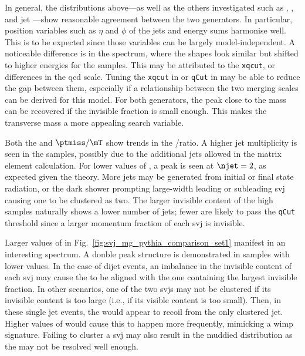 In general, the distributions above---as well as the others investigated such as \ptmiss, \mht, and \gls{jet} \pt---show reasonable agreement between the two generators. In particular, position variables such as $\eta$ and $\phi$ of the \glspl{jet} and energy sums harmonise well. This is to be expected since those variables can be largely model-independent. A noticeable difference is in the \mT spectrum, where the shapes look similar but shifted to higher energies for the \MADGRAPH samples. This may be attributed to the \texttt{xqcut}, or differences in the \acrshort{qcd} scale. Tuning the \texttt{xqcut} in \MADGRAPH or \texttt{qCut} in \PYTHIA may be able to reduce the gap between them, especially if a relationship between the two merging scales can be derived for this model. For both generators, the peak close to the \PZprime mass can be recovered if the invisible fraction is small enough. This makes the transverse mass a more appealing search variable.

Both the \njet and $\ptmiss/\mT$ show trends in the \MADGRAPH/\PYTHIA ratio. A higher \gls{jet} multiplicity is seen in the \MADGRAPH samples, possibly due to the additional \glspl{jet} allowed in the matrix element calculation. For lower values of \rinv, a peak is seen at $\njet = \text{2}$, as expected given the theory. More \glspl{jet} may be generated from initial or final state radiation, or the dark shower prompting large-width leading or subleading \gls{svj} causing one to be clustered as two. The larger invisible content of the high \rinv samples naturally shows a lower number of \glspl{jet}; fewer are likely to pass the \texttt{qCut} threshold since a larger momentum fraction of each \gls{svj} is invisible.

Larger values of \rinv in Fig.~\ref{fig:svj_mg_pythia_comparison_set1} manifest in an interesting \mindphi spectrum. A double peak structure is demonstrated in samples with lower values. In the case of dijet events, an imbalance in the invisible content of each \gls{svj} may cause the \ptmiss to be aligned with the one containing the largest invisible fraction. In other scenarios, one of the two \glspl{svj} may not be clustered if its invisible content is too large (i.e., if its visible content is too small). Then, in these single \gls{jet} events, the \ptmiss would appear to recoil from the only clustered jet. Higher values of \rinv would cause this to happen more frequently, mimicking a \acrshort{wimp} signature. Failing to cluster a \gls{svj} may also result in the muddied \mT distribution as the \ptvecmiss may not be resolved well enough.

